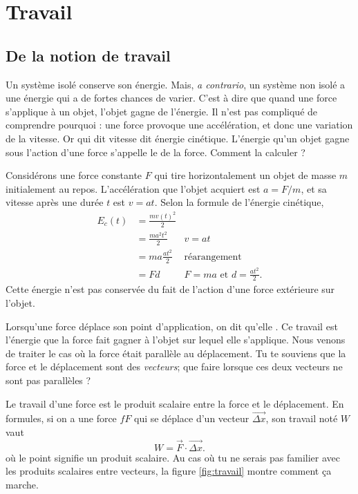 

\section{Travail}


\subsection{De la notion de travail}

Un système isolé conserve son énergie. Mais, \emph{a contrario}, un système non isolé a une énergie qui a de fortes chances de varier. C'est à dire que quand une force s'applique à un objet, l'objet gagne de l'énergie. Il n'est pas compliqué de comprendre pourquoi : une force provoque une accélération, et donc une variation de la vitesse. Or qui dit vitesse dit énergie cinétique. L'énergie qu'un objet gagne sous l'action d'une force s'appelle le  de la force. Comment la calculer ? 

Considérons une force constante $F$ qui tire horizontalement un objet de masse $m$ initialement au repos. L'accélération que l'objet acquiert est $a=F/m$, et sa vitesse après une durée $t$ est $v=at$. Selon la formule de l'énergie cinétique,
\begin{equation}
\begin{aligned}
   E_c(t)&=\frac{ mv(t)^2 }{ 2 }\\
	&=\frac{ ma^2t^2 }{ 2 }&\text{$v=at$}\\
	&=ma\frac{ at^2 }{ 2 }&\text{réarangement}\\
	&=Fd&\text{$F=ma$ et $d=\frac{ at^2 }{ 2 }$}.
\end{aligned}
\end{equation}
Cette énergie n'est pas conservée du fait de l'action d'une force extérieure sur l'objet.

Lorsqu'une force déplace son point d'application, on dit qu'elle . Ce travail est l'énergie que la force fait gagner à l'objet sur lequel elle s'applique. Nous venons de traiter le cas où la force était parallèle au déplacement. Tu te souviens que la force et le déplacement sont des \emph{vecteurs}; que faire lorsque ces deux vecteurs ne sont pas parallèles ?

Le travail d'une force est le produit scalaire entre la force et le déplacement. En formules, si on a une force $fF$ qui se déplace d'un vecteur $\overrightarrow{\Delta x}$, son travail noté $W$ vaut
\[
W=   \overrightarrow{F}\cdot\overrightarrow{\Delta x}.
\]
où le point signifie un produit scalaire. Au cas où tu ne serais pas familier avec les produits scalaires entre vecteurs, la figure \ref{fig:travail} montre comment ça marche.

